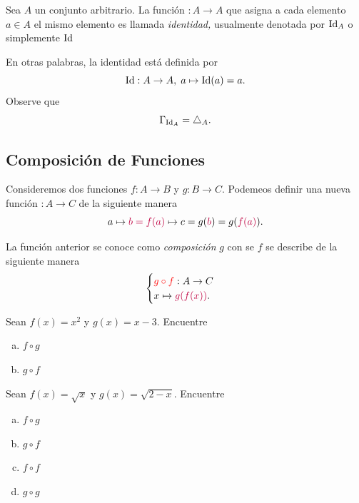 	\begin{exmp}
		Sea $A$ un conjunto arbitrario. La funci\'on $:A \to A$ que asigna a cada elemento $a\in A$ el mismo elemento es llamada \emph{identidad,} usualmente denotada por $\operatorname{Id}_{A}$ o simplemente $\operatorname{Id}$
		
		
		En otras palabras, la identidad est\'a definida por $$
		\operatorname{Id}:A\to A, \; a \mapsto \operatorname{Id}(a)=a.
		$$ Observe que
		$$
		\Gamma_{\operatorname{Id}_{A}}=\triangle_{A}.
		$$
	\end{exmp}
	


% 
% 
% 
% 
% 
% 
% 

\subsection{Composici\'on de Funciones}


	Consideremos dos funciones $f:A \to B$ y $g:B \to C.$ Podemeos definir una nueva funci\'on $:A \to C$ de la siguiente manera
	$$
	a \mapsto {\color{purple}b=f(a)} \mapsto c=g({\color{purple}b})=g({\color{purple}f(a)}).
	$$
	
	
	La funci\'on anterior se conoce como \emph{composici\'on} $g$ con se $f$ se describe de la siguiente manera
	$$
	\begin{cases} 
		{\color{red} g\circ f}:A\to C \\ 
		x \mapsto {\color{purple}g(f(x))}.
	\end{cases}
	$$




\begin{exmp}
Sean $f(x)=x^{2}$ y $g(x)=x-3.$ Encuentre 
\begin{enumerate}[(a)]
\item $f\circ g$ 
\item $g\circ f$
\end{enumerate}
\end{exmp}




\begin{exmp}
Sean $f(x)=\sqrt{x}$ y $g(x)=\sqrt{2-x}.$ Encuentre 
\begin{enumerate}[(a)]
\item $f\circ g$ 
\item $g\circ f$ 
\item $f\circ f$ 
\item $g\circ g$
\end{enumerate}

\end{exmp}


